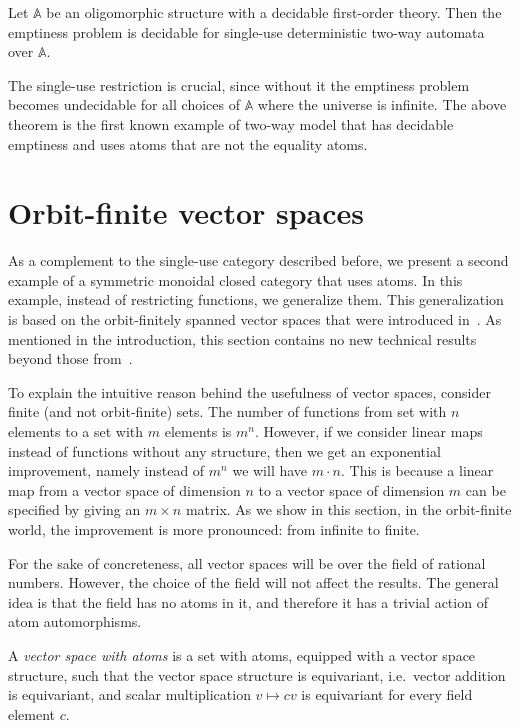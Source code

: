 \documentclass[10pt,a4paper]{amsart}
\numberwithin{equation}{section}
\theoremstyle{plain}
\newcommand{\atoms}{\mathbb A}
\begin{document}
\begin{theorem}\label{thm:two-way-automata}
    Let $\atoms$ be an oligomorphic structure with a decidable first-order theory. Then the emptiness problem is decidable for single-use deterministic  two-way automata over $\atoms$.
\end{theorem}


The single-use restriction is crucial, since without it the emptiness problem becomes undecidable for all choices of $\atoms$ where the universe is infinite. The above theorem is the first known example of two-way model that has decidable emptiness and uses atoms that are not the equality atoms. 


\section{Orbit-finite vector spaces}
As a complement to the single-use category described before, we present a second example of a symmetric monoidal closed category that  uses atoms. In this example, instead of restricting functions, we generalize them. This generalization is based on the  orbit-finitely spanned vector spaces that were introduced in~\cite{bojanczykKM21OrbitFiniteVector}. As mentioned in the introduction,  this section contains no new technical results beyond those from~\cite{bojanczykKM21OrbitFiniteVector}. 

To explain the intuitive reason behind the usefulness of vector spaces, consider finite (and not orbit-finite) sets. The number of functions from set with $n$ elements to a set with $m$ elements is $m^n$. However, if we consider linear maps instead of functions without any structure, then we get an exponential improvement, namely instead of $m^n$ we will have $m \cdot n$. 
This is because a linear map from a vector space of dimension $n$ to a vector space of dimension $m$ can be specified by giving an $m \times n$ matrix. As we show in this section,  in the orbit-finite world, the improvement is more pronounced: from infinite to finite.

For the sake of concreteness, all  vector spaces will be over the field of rational numbers. However, the choice of the field will not affect the results. The general idea is that the field has no atoms in it, and therefore it has a trivial action of atom automorphisms. 
\begin{definition}
    A \emph{vector space with atoms} is a set with atoms, equipped with a vector space structure, such that the vector space structure is equivariant, i.e.~vector addition is equivariant, and  scalar multiplication $v \mapsto cv$ is equivariant for every field element $c$.
\end{definition}
\end{document}
